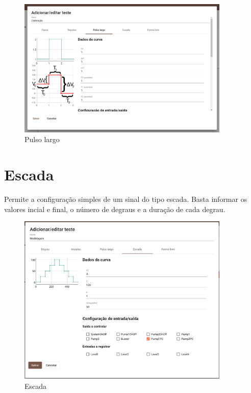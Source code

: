 \begin{figure}[ht!]
    \centering
    \includegraphics[width=0.9\textwidth]{imgs/system-response5}
    \caption[Pulso largo]{Pulso largo}%
    \label{fig:system-response5}
\end{figure}

\newpage{}
\section{Escada}%
\label{sec:stairs}

Permite a configuração simples de um sinal do tipo escada. Basta informar os
valores incial e final, o número de degraus e a duração de cada degrau.

\begin{figure}[ht!]
    \centering
    \includegraphics[width=0.9\textwidth]{imgs/system-response6}
    \caption[Escada]{Escada}%
    \label{fig:system-response6}
\end{figure}

